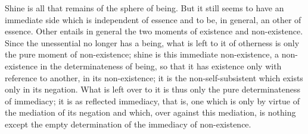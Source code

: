 Shine is all that remains of the sphere of being.
But it still seems to have an immediate side
which is independent of essence
and to be, in general, an other of essence.
Other entails in general the two moments
of existence and non-existence.
Since the unessential no longer has a being,
what is left to it of otherness is
only the pure moment of non-existence;
shine is this immediate non-existence,
a non-existence in the determinateness of being,
so that it has existence only with reference to another,
in its non-existence;
it is the non-self-subsistent
which exists only in its negation.
What is left over to it is thus only
the pure determinateness of immediacy;
it is as reflected immediacy, that is,
one which is only by virtue of
the mediation of its negation
and which, over against this mediation, is
nothing except the empty determination
of the immediacy of non-existence.

